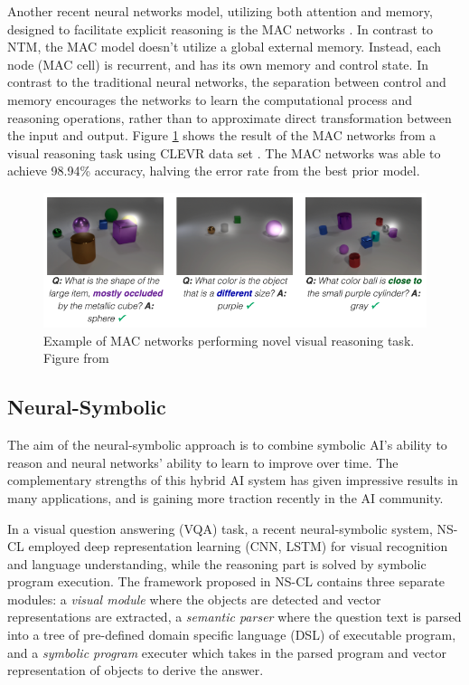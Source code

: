 \documentclass[journal]{IEEEtran}
\begin{document}
Another recent neural networks model, utilizing both attention and memory, designed to facilitate explicit reasoning is the MAC networks \cite{hudson2018compositional}.
In contrast to NTM, the MAC model doesn't utilize a global external memory. Instead, each node (MAC cell) is recurrent, and has its own memory and control state.
In contrast to the traditional neural networks, the separation between control and memory encourages the networks to 
learn the computational process and reasoning operations, rather than to approximate direct transformation between the input and output.
Figure \ref{mac-clevr} shows the result of the MAC networks from a visual reasoning task using CLEVR data set \cite{johnson2017clevr}. 
The MAC networks was able to achieve 98.94\% accuracy, halving the error rate from the best prior model.
\begin{figure}[htb]
  \includegraphics[width=\linewidth]{mac-clevr.png}
  \caption{Example of MAC networks performing novel visual reasoning task. Figure from \cite{hudson2018compositional}}
  \label{mac-clevr}
\end{figure}

\subsection{Neural-Symbolic}
The aim of the neural-symbolic approach is to combine symbolic AI's ability to reason 
and neural networks' ability to learn to improve over time. 
The complementary strengths of this hybrid AI system has given impressive results in many applications, 
and is gaining more traction recently in the AI community.

In a visual question answering (VQA) task, a recent neural-symbolic system, NS-CL \cite{Mao2019NeuroSymbolic} employed deep representation learning (CNN, LSTM)
for visual recognition and language understanding, while the reasoning part is solved by symbolic program execution.
The framework proposed in NS-CL contains three separate modules: 
a \textit{visual module} where the objects are detected and vector representations are extracted, 
a \textit{semantic parser} where the question text is parsed into a tree of pre-defined domain specific language (DSL) of executable program,
and a \textit{symbolic program} executer which takes in the parsed program and vector representation of objects to derive the answer. 
\end{document}
